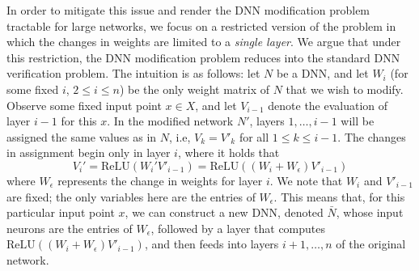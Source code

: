 \documentclass{easychair}
\newcommand{\relu}{\text{ReLU}\xspace{}}
\begin{document}
In order to mitigate this issue and render the DNN modification
problem tractable 
for large networks, we focus on a restricted version of
the problem in which the changes in weights are
limited to a \emph{single layer}. We argue that under this
restriction, the DNN modification problem reduces into the standard DNN
verification problem. The intuition is as follows: let $N$ be a DNN,
and let $W_i$ (for some fixed $i$, $2\leq i\leq n$) be the only weight matrix of $N$ that
we wish to modify. Observe some fixed input point $x\in X$, and let
$V_{i-1}$ denote the evaluation of layer $i-1$ for this $x$. In the
modified network $N'$, layers $1,\ldots,i-1$ will be assigned the same
values as in $N$, i.e, $V_k=V'_k$ for all $1\leq k\leq i-1$. The
changes in assignment begin only in layer $i$, where it holds that
\[
  V_i' = \relu{}(W_i'V'_{i-1}) = \relu{}((W_i+W_\epsilon)V'_{i-1})
\]
where $W_\epsilon$ represents the change in weights for layer $i$. We note that
$W_i$ and $V'_{i-1}$ are fixed; the only variables here are the
entries of $W_\epsilon$. This means that, for this particular input
point $x$,  we can construct a new DNN,
denoted $\bar{N}$, whose input neurons are the entries of $W_\epsilon$,
followed by a layer that computes $\relu{}((W_i+W_\epsilon)V'_{i-1})$,
and then feeds into layers $i+1,\ldots,n$ of the original network.
\end{document}
